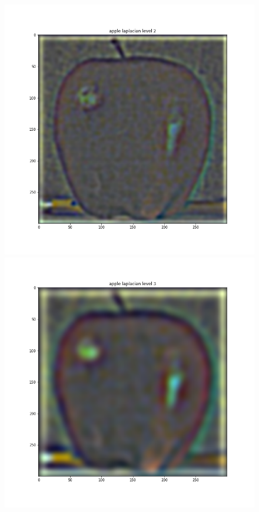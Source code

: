 \documentclass{article}
\begin{document}
\begin{figure}[!htb]
\endminipage
{}
    \includegraphics[width=\linewidth]{apple laplacian level 2.png}
\endminipage
{}
    \includegraphics[width=\linewidth]{apple laplacian level 3.png}

\end{figure}
\end{document}

